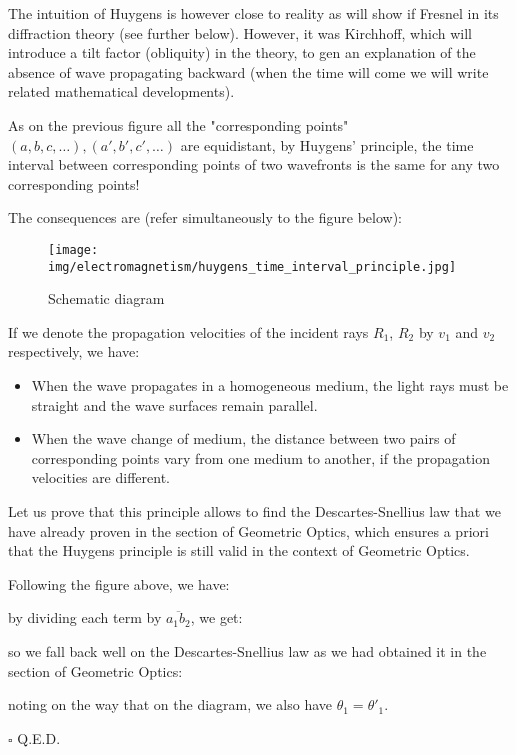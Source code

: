	The intuition of Huygens is however close to reality as will show if Fresnel in its diffraction theory (see further below). However, it was Kirchhoff, which will introduce a tilt factor (obliquity) in the theory, to gen an explanation of the absence of wave propagating backward (when the time will come we will write related mathematical developments).
	
	As on the previous figure all the "corresponding points" $(a,b,c,\ldots),(a',b',c',\ldots)$ are  equidistant, by Huygens' principle, the time interval between corresponding points of two wavefronts is the same for any two corresponding points!
	
	The consequences are (refer simultaneously to the figure below):
	\begin{figure}[H]
		\centering
		\texttt{[image: img/electromagnetism/huygens\_time\_interval\_principle.jpg]}
		\caption[]{Schematic diagram}
	\end{figure}
	If we denote the propagation velocities of the incident rays $R_1$, $R_2$ by $v_1$ and $v_2$ respectively, we have:
	
	\begin{itemize}
		\item When the wave propagates in a homogeneous medium, the light rays must be straight and the wave surfaces remain parallel.

		\item When the wave change of medium, the distance between two pairs of corresponding points vary from one medium to another, if the propagation velocities are different.
	\end{itemize}
	\begin{theorem}
	Let us prove that this principle allows to find the Descartes-Snellius law that we have already proven in the section of Geometric Optics, which ensures a priori that the Huygens principle is still valid in the context of Geometric Optics.
	\end{theorem}
	\begin{dem}
	Following the figure above, we have:
	
	by dividing each term by $\overline{a_1b_2}$, we get:
	
	so we fall back well on the Descartes-Snellius law as we had obtained it in the section of Geometric Optics:
	
	noting on the way that on the diagram, we also have $\theta_1={\theta'}_1$.
	\begin{flushright}
		$\square$  Q.E.D.
	\end{flushright}
	\end{dem}
		
